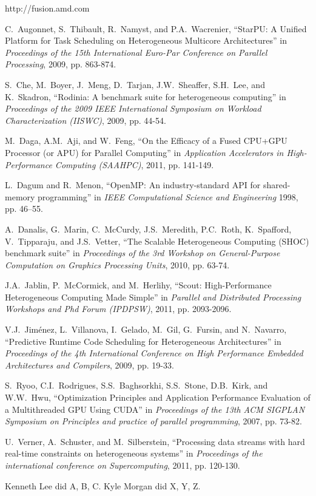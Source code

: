 \documentclass[journal]{IEEEtran}
\begin{document}
\begin{thebibliography}{1}

http://fusion.amd.com

C.~Augonnet, S.~Thibault, R.~Namyst, and P.A.~Wacrenier,
``StarPU: A Unified Platform for Task Scheduling on Heterogeneous Multicore Architectures'' in
\emph{Proceedings of the 15th International Euro-Par Conference on Parallel Processing}, 2009, pp. 863-874.

S.~Che, M.~Boyer, J.~Meng, D.~Tarjan, J.W.~Sheaffer, S.H.~Lee, and K.~Skadron,
``Rodinia: A benchmark suite for heterogeneous computing'' in
\emph{Proceedings of the 2009 IEEE International Symposium on Workload Characterization (IISWC)}, 2009, pp. 44-54.

M.~Daga, A.M.~Aji, and W.~Feng,
``On the Efficacy of a Fused CPU+GPU Processor (or APU) for Parallel Computing'' in
\emph{Application Accelerators in High-Performance Computing (SAAHPC)}, 2011, pp. 141-149.

L.~Dagum and R.~Menon,
``OpenMP: An industry-standard API for shared-memory programming'' in
\emph{IEEE Computational Science and Engineering} 1998, pp. 46–55.

A.~Danalis, G.~Marin, C.~McCurdy, J.S.~Meredith, P.C.~Roth, K.~Spafford, V.~Tipparaju, and J.S.~Vetter,
``The Scalable Heterogeneous Computing (SHOC) benchmark suite'' in
\emph{Proceedings of the 3rd Workshop on General-Purpose Computation on Graphics Processing Units}, 2010, pp. 63-74.

J.A.~Jablin, P.~McCormick, and M.~Herlihy,
``Scout: High-Performance Heterogeneous Computing Made Simple'' in
\emph{Parallel and Distributed Processing Workshops and Phd Forum (IPDPSW)}, 2011, pp. 2093-2096.

V.J.~Jiménez, L.~Villanova, I.~Gelado, M.~Gil, G.~Fursin, and N.~Navarro,
``Predictive Runtime Code Scheduling for Heterogeneous Architectures'' in
\emph{Proceedings of the 4th International Conference on High Performance Embedded Architectures and Compilers}, 2009, pp. 19-33.

S.~Ryoo, C.I.~Rodrigues, S.S.~Baghsorkhi, S.S.~Stone, D.B.~Kirk, and W.W.~Hwu,
``Optimization Principles and Application Performance Evaluation of a Multithreaded GPU Using CUDA'' in
\emph{Proceedings of the 13th ACM SIGPLAN Symposium on Principles and practice of parallel programming}, 2007, pp. 73-82.

U.~Verner, A.~Schuster, and M.~Silberstein,
``Processing data streams with hard real-time constraints on heterogeneous systems'' in
\emph{Proceedings of the international conference on Supercomputing}, 2011, pp. 120-130.

\end{thebibliography}

\newpage
{}
Kenneth Lee did A, B, C.  Kyle Morgan did X, Y, Z.
\end{document}
